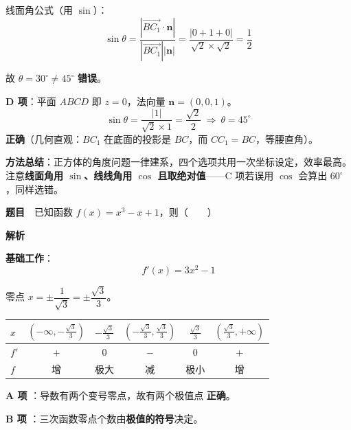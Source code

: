 线面角公式（用 $\sin$）：
\[\sin\theta=\frac{\left|\overrightarrow{BC_1}\cdot\boldsymbol n\right|}{\left|\overrightarrow{BC_1}\right|\left|\boldsymbol n\right|}=\frac{|0+1+0|}{\sqrt2\times\sqrt2}=\frac12\]

故 $\theta=30^\circ\ne45^\circ$  \textbf{错误}。

\par\medskip

\textbf{D 项}：平面 $ABCD$ 即 $z=0$，法向量 $\boldsymbol n=(0,0,1)$。
\[\sin\theta=\frac{|1|}{\sqrt2\times1}=\frac{\sqrt2}2\ \Longrightarrow\ \theta=45^\circ\]
 \textbf{正确}（几何直观：$BC_1$ 在底面的投影是 $BC$，而 $CC_1=BC$，等腰直角）。


\begin{gktip}
\textbf{方法总结}：正方体的角度问题一律建系，四个选项共用一次坐标设定，效率最高。注意\textbf{线面角用 $\sin$、线线角用 $\cos$ 且取绝对值}——C 项若误用 $\cos$ 会算出 $60^\circ$，同样选错。
\end{gktip}

\par\medskip


\textbf{题目}　已知函数 $f(x)=x^{3}-x+1$，则（　　）

\textbf{解析}

\textbf{基础工作}：
\[f'(x)=3x^{2}-1\]

零点 $x=\pm\dfrac1{\sqrt3}=\pm\dfrac{\sqrt3}3$。

\begin{center}
\begin{tabular}{lccccc}
\toprule
$x$ & $\left(-\infty,-\frac{\sqrt3}3\right)$ & $-\frac{\sqrt3}3$ & $\left(-\frac{\sqrt3}3,\frac{\sqrt3}3\right)$ & $\frac{\sqrt3}3$ & $\left(\frac{\sqrt3}3,+\infty\right)$ \\
\midrule
$f'$ & $+$ & $0$ & $-$ & $0$ & $+$ \\
$f$ & 增 & 极大 & 减 & 极小 & 增 \\
\bottomrule
\end{tabular}
\end{center}

\par\medskip

\textbf{A 项 }：导数有两个变号零点，故有两个极值点 \textbf{正确}。

\par\medskip

\textbf{B 项 }：三次函数零点个数由\textbf{极值的符号}决定。

